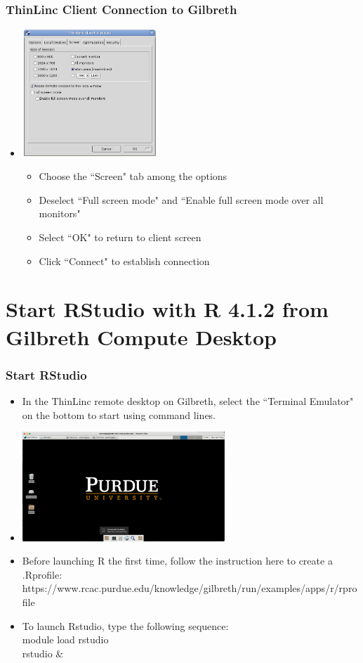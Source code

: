 \documentclass[aspectratio=169]{beamer}
\begin{document}
\begin{frame}
\frametitle{ThinLinc Client Connection to Gilbreth}

\begin{itemize}
	\item \includegraphics[width=2in]{ThinLincScreenOptions.png}
\begin{itemize}
	\item Choose the ``Screen" tab among the options
	\item Deselect ``Full screen mode" and ``Enable full screen mode over all monitors"
	\item Select ``OK" to return to client screen
	\item Click ``Connect" to establish connection
\end{itemize}

\end{itemize}
\end{frame}

\section{Start RStudio with R 4.1.2 from Gilbreth Compute Desktop}

\begin{frame}
\frametitle{Start RStudio}
        \begin{itemize}
	\item In the ThinLinc remote desktop on Gilbreth, select the ``Terminal Emulator" on the bottom to start using command lines.
        \item \includegraphics[width=3in]{ThinlincClientXterm_Gilbreth.png}
	\item Before launching R the first time, follow the instruction here to create a .Rprofile:\\
	https://www.rcac.purdue.edu/knowledge/gilbreth/run/examples/apps/r/rprofile
        	\item To launch Rstudio, type the following sequence:\\
	module load rstudio\\
        rstudio \&
        \end{itemize}
\end{frame}
\end{document}
